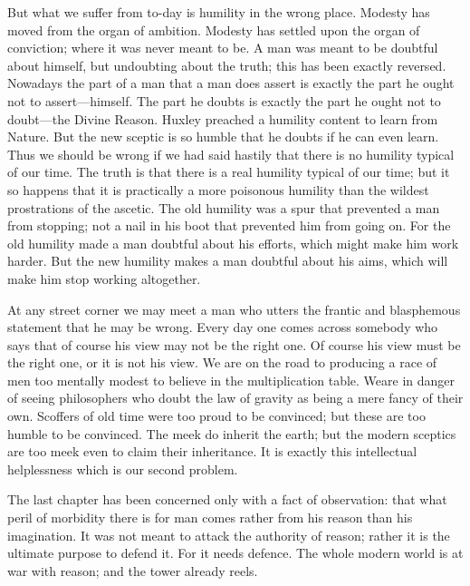 \documentclass{book}
\begin{document}
But what we suffer from to-day is humility in the wrong place. Modesty has moved from the organ of ambition. Modesty has settled upon the organ of conviction; where it was never meant to be. A man was meant to be doubtful about himself, but undoubting about the truth; this has been exactly reversed. Nowadays the part of a man that a man does assert is exactly the part he ought not to assert—himself. The part he doubts is exactly the part he ought not to doubt—the Divine Reason. Huxley preached a humility content to learn from Nature. But the new sceptic is so humble that he doubts if he can even learn. Thus we should be wrong if we had said hastily that there is no humility typical of our time. The truth is that there is a real humility typical of our time; but it so happens that it is practically a more poisonous humility than the wildest prostrations of the ascetic. The old humility was a spur that prevented a man from stopping; not a nail in his boot that prevented him from going on. For the old humility made a man doubtful about his efforts, which might make him work harder. But the new humility makes a man doubtful about his aims, which will make him stop working altogether.

At any street corner we may meet a man who utters the frantic and blasphemous statement that he may be wrong. Every day one comes across somebody who says that of course his view may not be the right one. Of course his view must be the right one, or it is not his view. We are on the road to producing a race of men too mentally modest to believe in the multiplication table. Weare in danger of seeing philosophers who doubt the law of gravity as being a mere fancy of their own. Scoffers of old time were too proud to be convinced; but these are too humble to be convinced. The meek do inherit the earth; but the modern sceptics are too meek even to claim their inheritance. It is exactly this intellectual helplessness which is our second problem.

The last chapter has been concerned only with a fact of observation: that what peril of morbidity there is for man comes rather from his reason than his imagination. It was not meant to attack the authority of reason; rather it is the ultimate purpose to defend it. For it needs defence. The whole modern world is at war with reason; and the tower already reels.
\end{document}
